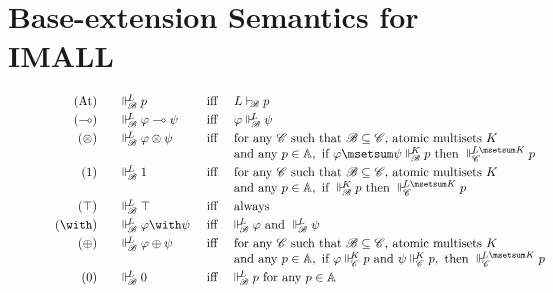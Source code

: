 \documentclass{beamer}
\begin{document}
\section{Base-extension Semantics for IMALL}
\begin{frame}
	\noindent\begin{minipage}{0.47\textwidth}\scriptsize
	\begin{figure}[t]
				  \[
				\begin{array}{r@{\qquad}l@{\quad}c@{\quad}l}
				   \mbox{(At)} & \suppM{\baseB}{L} p  & \text{ iff } &   L\deriveBaseM{\baseB} p  \\ [1mm]
					(\mto) & \suppM{\baseB}{L} \varphi \mto \psi & \text{ iff } & \varphi \suppM{\baseB}{L} \psi \\[1mm]
					(\mand) & \suppM{\baseB}{L} \varphi \mand \psi   & \text{ iff } &  \text{for any } \baseC  \text{ such that } \baseB \baseLeq \baseC \text{, atomic multisets } K \\ 
					& & & \text{and any } p \in \At, \text{ if } \varphi\msetsum\psi\suppM{\baseB}{K}p \text{ then } \suppM{\baseC}{L\msetsum K} p  \\[1mm]
					(\mtop) & \suppM{\baseB}{L} \mtop   & \text{ iff } &  \text{for any } \baseC  \text{ such that } \baseB \baseLeq \baseC \text{, atomic multisets } K \\ 
					& & & \text{and any } p \in \At, \text{ if } \suppM{\baseB}{K}p \text{ then } \suppM{\baseC}{L\msetsum K} p  \\[1mm]
					(\top) & \suppM{\baseB}{L} \top & \text{ iff } & \text{always} \\[1mm] 
					(\aand) & \suppM{\baseB}{L} \varphi \aand \psi   & \text{ iff } &   \suppM{\baseB}{L} \varphi \text{ and }   \suppM{\baseB}{L} \psi  \\[1mm] 
					(\aor) & \suppM{\baseB}{L} \varphi \aor \psi & \text{ iff } &  \text{for any } \baseC  \text{ such that } \baseB \baseLeq \baseC \text{, atomic multisets } K \\ 
					& & & \text{and any } p \in \At, \text{ if } \varphi \suppM{\baseC}{K} p \text{ and } \psi \suppM{\baseC}{K} p, \text{ then } \suppM{\baseC}{L\msetsum K} p  \\[1mm]
					(\abot) & \suppM{\baseB}{L} \abot & \text{iff} &    \suppM{\baseB}{L} p \text{ for any } p \in \At \\[1mm]

\end{array}\]
\end{figure}
\end{minipage}
\end{frame}
\end{document}
